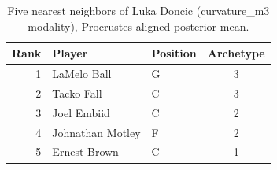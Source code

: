 \begin{table}[htbp]
  \centering\small
  \begin{tabular}{rllc}
    \toprule
    Rank & Player & Position & Archetype \\
    \midrule
    1 & LaMelo Ball & G & 3 \\
    2 & Tacko Fall & C & 3 \\
    3 & Joel Embiid & C & 2 \\
    4 & Johnathan Motley & F & 2 \\
    5 & Ernest Brown & C & 1 \\
    \bottomrule
  \end{tabular}
  \caption{Five nearest neighbors of Luka Doncic (curvature_m3 modality), Procrustes-aligned posterior mean.}
  \label{tab:Luka_Doncic_neighbors_curvature_m3}
\end{table}

